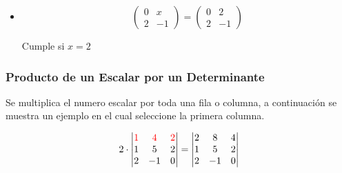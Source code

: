 \documentclass[stu, 12pt, a4paper, donotrepeattitle, floatsintext, natbib]{apa7}
\begin{document}
\begin{itemize}
        \item \begin{equation*}
                  \begin{pmatrix}
                      0 & x  \\
                      2 & -1
                  \end{pmatrix}
                  =
                  \begin{pmatrix}
                      0 & 2  \\
                      2 & -1
                  \end{pmatrix}
        \end{equation*}
        \begin{center}
            Cumple si $x=2$
        \end{center}
    \end{itemize}

    \subsubsection{Producto de un Escalar por un Determinante}
    Se multiplica el numero escalar por toda una fila o columna, a continuación se muestra un ejemplo en el cual seleccione la primera columna.

    \[
        2 \cdot
        \begin{vmatrix}
            \color{red}1 & \color{red}4 & \color{red}2 \\
            1            & 5            & 2            \\
            2            & -1           & 0            \\
        \end{vmatrix}
        =
        \begin{vmatrix}
            2 & 8  & 4 \\
            1 & 5  & 2 \\
            2 & -1 & 0
        \end{vmatrix}
    \]
    \newpage
\end{document}
